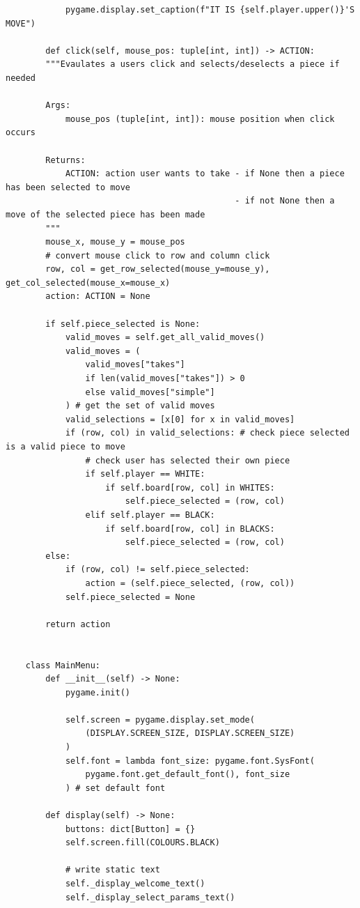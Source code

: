 \documentclass{article}
\begin{document}
\begin{verbatim}
            pygame.display.set_caption(f"IT IS {self.player.upper()}'S MOVE")

        def click(self, mouse_pos: tuple[int, int]) -> ACTION:
        """Evaulates a users click and selects/deselects a piece if needed

        Args:
            mouse_pos (tuple[int, int]): mouse position when click occurs

        Returns:
            ACTION: action user wants to take - if None then a piece has been selected to move
                                              - if not None then a move of the selected piece has been made
        """
        mouse_x, mouse_y = mouse_pos 
        # convert mouse click to row and column click
        row, col = get_row_selected(mouse_y=mouse_y), get_col_selected(mouse_x=mouse_x)
        action: ACTION = None

        if self.piece_selected is None:
            valid_moves = self.get_all_valid_moves()
            valid_moves = (
                valid_moves["takes"]
                if len(valid_moves["takes"]) > 0
                else valid_moves["simple"]
            ) # get the set of valid moves 
            valid_selections = [x[0] for x in valid_moves]
            if (row, col) in valid_selections: # check piece selected is a valid piece to move
                # check user has selected their own piece
                if self.player == WHITE:
                    if self.board[row, col] in WHITES:
                        self.piece_selected = (row, col)
                elif self.player == BLACK:
                    if self.board[row, col] in BLACKS:
                        self.piece_selected = (row, col)
        else:
            if (row, col) != self.piece_selected:
                action = (self.piece_selected, (row, col))
            self.piece_selected = None

        return action


    class MainMenu:
        def __init__(self) -> None:
            pygame.init()

            self.screen = pygame.display.set_mode(
                (DISPLAY.SCREEN_SIZE, DISPLAY.SCREEN_SIZE)
            )
            self.font = lambda font_size: pygame.font.SysFont(
                pygame.font.get_default_font(), font_size
            ) # set default font

        def display(self) -> None:
            buttons: dict[Button] = {}
            self.screen.fill(COLOURS.BLACK)

            # write static text
            self._display_welcome_text()
            self._display_select_params_text()


\end{verbatim}
\end{document}
